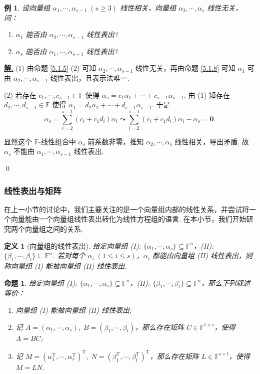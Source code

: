 \documentclass[10pt,openany]{article}
\theoremstyle{thmstyle} %
\theoremstyle{defstyle} %
\newtheorem{definition}[theorem]{定义}
\theoremstyle{prostyle} %
\newtheorem{proposition}[theorem]{命题}
\theoremstyle{exastyle}
\newtheorem{example}[theorem]{例}
\theoremstyle{remstyle}
\newenvironment{solution}{\par\underline{\textbf{解.}} \;\fangsong}{\qed\par}
\newcommand{\T}{^{\text{T}}}
\newcommand{\F}{\mathbb{F}}
\begin{document}
\begin{example}
	设向量组 \( \alpha_1,\cdots,\alpha_{s-1} \; (s \geq 3) \) 线性相关，向量组 \( \alpha_2,\cdots,\alpha_s \) 线性无关，问：
	\begin{enumerate}[(1)]
		\item \( \alpha_1 \) 能否由 \( \alpha_2,\cdots,\alpha_{s-1} \) 线性表出?
		\item \( \alpha_s \) 能否由 \( \alpha_1,\cdots,\alpha_{s-1} \) 线性表出?
	\end{enumerate}
\end{example}

\begin{solution}
	(1) 由命题 \ref{5.1.5} (2) 可知 \( \alpha_2,\cdots,\alpha_{s-1} \) 线性无关，再由命题 \ref{5.1.8} 可知 \( \alpha_1 \) 可由 \( \alpha_2,\cdots,\alpha_{s-1} \) 线性表出，且表示法唯一.
	
	(2) 若存在 \( c_1,\cdots,c_{s-1} \in \F \) 使得 \( \alpha_s=c_1\alpha_1+\cdots+c_{s-1}\alpha_{s-1} \). 由 (1) 知存在 \( d_2,\cdots,d_{s-1} \in \F \) 使得 \( \alpha_1=d_2\alpha_2+\cdots+d_{s-1}\alpha_{s-1} \). 于是
	\[ \alpha_s= \sum_{i=2}^{s-1} (c_i+c_1d_i) \alpha_i \leadsto \sum_{i=2}^{s-1} (c_i+c_1d_i) \alpha_i-\alpha_s=\bm{0}. \]
	
	显然这个 \( \F\)-线性组合中 \( \alpha_s \) 前系数非零，推知 \( \alpha_2,\cdots,\alpha_s \) 线性相关，导出矛盾. 故 \( \alpha_s \) 不能由 \( \alpha_1,\cdots,\alpha_{s-1} \) 线性表出.
	
\end{solution}

\subsubsection{线性表出与矩阵}

在上一小节的讨论中，我们主要关注的是一个向量组内部的线性关系，并尝试将一个向量能由一个向量组线性表出转化为线性方程组的语言. 在本小节，我们开始研究两个向量组之间的关系.

\begin{definition}[向量组的线性表出]
	给定向量组 (I): \( \{\alpha_1,\cdots,\alpha_s\} \subseteq \F^n \)，(II): \( \{\beta_1,\cdots,\beta_t\} \subseteq \F^n \). 若对每个 \( \alpha_i \; (1 \leq i \leq s) \)，\( \alpha_i \) 都能由向量组 (II) 线性表出，则称向量组 (I) 能被向量组 (II) 线性表出.
\end{definition}

\begin{proposition} \label{5.1.11}
	给定向量组 (I): \( \{\alpha_1,\cdots,\alpha_s\} \subseteq \F^n \)，(II): \( \{\beta_1,\cdots,\beta_t\} \subseteq \F^n \)，那么下列叙述等价：
	\begin{enumerate}[(1)]
		\item 向量组 (I) 能被向量组 (II) 线性表出;
		\item 记 \( A=(\alpha_1,\cdots,\alpha_s), \; B=(\beta_1,\cdots,\beta_t) \)，那么存在矩阵 \( C \in \F^{t \times s} \)，使得 \( A=BC \);
		\item 记 \( M=(\alpha_1\T,\cdots,\alpha_s\T)\T, \; N=(\beta_1\T,\cdots,\beta_t\T)\T \)，那么存在矩阵 \( L \in \F^{s \times t} \)，使得 \( M=LN \).
	\end{enumerate}
\end{proposition}
\end{document}
